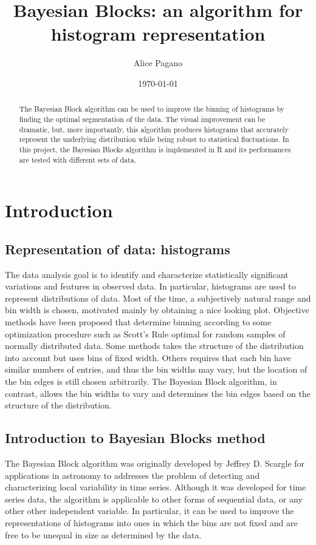 \documentclass[prb,twocolumn]{revtex4-1}
\begin{document}
\title{Bayesian Blocks: an algorithm for histogram representation} 

\author{Alice Pagano}

\date{\today}

\begin{abstract}

The Bayesian Block algorithm can be used to improve the binning of histograms by finding the optimal segmentation of the data. The visual improvement can be dramatic, but, more importantly, this algorithm produces histograms that accurately represent the underlying distribution while being robust to statistical fluctuations. In this project, the Bayesian Blocks algorithm is implemented in R and its performances are tested with different sets of data.


\end{abstract}

\maketitle


\section{Introduction}

\subsection{Representation of data: histograms}
The data analysis goal is to identify and characterize statistically significant variations and features in observed data. In particular, histograms are used to represent distributions of data.
Most of the time, a subjectively natural range and bin width is chosen, motivated mainly by obtaining a nice looking plot. Objective methods have been proposed that determine binning according to some optimization procedure such as Scott’s Rule optimal for random samples of normally distributed data. Some methods takes the structure of the distribution into account but uses bins of fixed width. Others requires that each bin have similar numbers of entries, and thus the bin widths may vary, but the location of the bin edges is still chosen arbitrarily.
The Bayesian Block algorithm, in contrast, allows the bin widths to vary and determines the bin edges based on the structure of the distribution.

\subsection{Introduction to Bayesian Blocks method}
The Bayesian Block algorithm was originally developed by Jeffrey D. Scargle \cite{Scargle1,Scargle2} for applications in astronomy to addresses the problem of detecting and characterizing local variability in time series. Although it was developed for time series data, the algorithm is applicable to other forms of sequential data, or any other other independent variable. In particular, it can be used to improve the representations of histograms into ones in which the bins are not fixed  and are free to be unequal in size as determined by the data.
\end{document}
